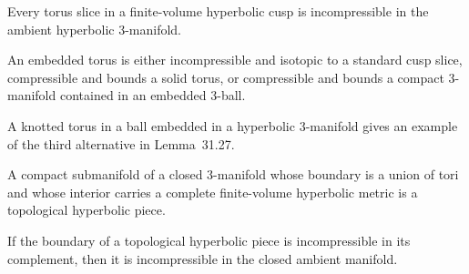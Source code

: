 \begin{lemma}
\label{lem:chow-iv-boundary-torus-incompressible}
Every torus slice in a finite-volume hyperbolic cusp is incompressible in the
ambient hyperbolic 3-manifold.
\end{lemma}

\begin{lemma}
\label{lem:chow-iv-embedded-torus-trichotomy}
An embedded torus is either incompressible and isotopic to a standard cusp
slice, compressible and bounds a solid torus, or compressible and bounds a
compact 3-manifold contained in an embedded 3-ball.
\end{lemma}

\begin{example}
\label{ex:chow-iv-knotted-compressible-torus}
A knotted torus in a ball embedded in a hyperbolic 3-manifold gives an example
of the third alternative in Lemma~31.27.
\end{example}

\begin{definition}
\label{def:chow-iv-topological-hyperbolic-piece}
A compact submanifold of a closed 3-manifold whose boundary is a union of tori
and whose interior carries a complete finite-volume hyperbolic metric is a
topological hyperbolic piece.
\end{definition}

\begin{corollary}
\label{cor:chow-iv-hyperbolic-piece-incompressibility}
If the boundary of a topological hyperbolic piece is incompressible in its
complement, then it is incompressible in the closed ambient manifold.
\end{corollary}

